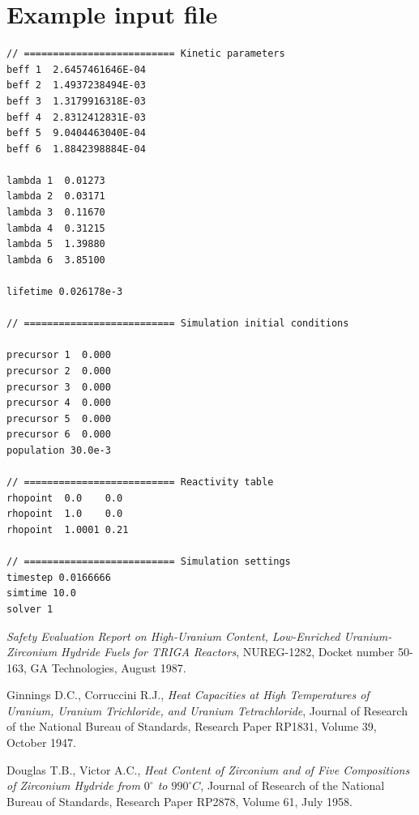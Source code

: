 \documentclass[11pt,letterpaper,titlepage]{article}
\begin{document}
\newpage
{}
\section{Example input file}
\begin{verbatim}
// ========================== Kinetic parameters
beff 1  2.6457461646E-04 
beff 2  1.4937238494E-03 
beff 3  1.3179916318E-03 
beff 4  2.8312412831E-03 
beff 5  9.0404463040E-04 
beff 6  1.8842398884E-04 

lambda 1  0.01273 
lambda 2  0.03171 
lambda 3  0.11670 
lambda 4  0.31215 
lambda 5  1.39880 
lambda 6  3.85100 

lifetime 0.026178e-3

// ========================== Simulation initial conditions

precursor 1  0.000
precursor 2  0.000
precursor 3  0.000
precursor 4  0.000
precursor 5  0.000
precursor 6  0.000
population 30.0e-3

// ========================== Reactivity table
rhopoint  0.0    0.0
rhopoint  1.0    0.0
rhopoint  1.0001 0.21

// ========================== Simulation settings
timestep 0.0166666
simtime 10.0
solver 1
\end{verbatim}


\newpage
{}
\begin{thebibliography}{1}

	 {\em Safety Evaluation Report on High-Uranium Content, Low-Enriched Uranium-Zirconium Hydride Fuels for TRIGA Reactors}, NUREG-1282, Docket number 50-163, GA Technologies, August 1987.
	
	 Ginnings D.C., Corruccini R.J., {\em Heat Capacities at High Temperatures of Uranium, Uranium Trichloride, and Uranium Tetrachloride}, Journal of Research of the National Bureau of Standards, Research Paper RP1831, Volume 39, October 1947.
	
	 Douglas T.B., Victor A.C., {\em Heat Content of Zirconium and of Five Compositions of Zirconium Hydride from $0^{\circ}$ to $990^{\circ}C$}, Journal of Research of the National Bureau of Standards, Research Paper RP2878, Volume 61, July 1958.
	
\end{thebibliography}
\end{document}
